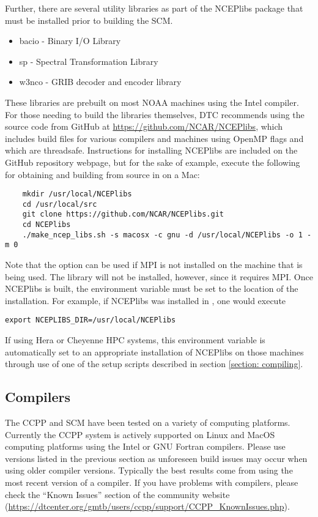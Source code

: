 Further, there are several utility libraries as part of the NCEPlibs package that must be installed prior to building the SCM. 
\begin{itemize}
    \item bacio - Binary I/O Library
    \item sp - Spectral Transformation Library
    \item w3nco - GRIB decoder and encoder library
\end{itemize}
These libraries are prebuilt on most NOAA machines using the Intel compiler. For those needing to build the libraries themselves, DTC recommends using the source code from GitHub at \url{https://github.com/NCAR/NCEPlibs}, which includes build files for various compilers and machines using OpenMP flags and which are threadsafe. Instructions for installing NCEPlibs are included on the GitHub repository webpage, but for the sake of example, execute the following for obtaining and building from source in  on a Mac:
\begin{lstlisting}
    mkdir /usr/local/NCEPlibs
    cd /usr/local/src
    git clone https://github.com/NCAR/NCEPlibs.git
    cd NCEPlibs
    ./make_ncep_libs.sh -s macosx -c gnu -d /usr/local/NCEPlibs -o 1 -m 0
\end{lstlisting}
Note that the option  can be used if MPI is not installed on the machine that is being used. The  library will not be installed, however, since it requires MPI. Once NCEPlibs is built, the  environment variable must be set to the location of the installation. For example, if NCEPlibs was installed in , one would execute
\begin{lstlisting}
export NCEPLIBS_DIR=/usr/local/NCEPlibs
\end{lstlisting}
If using Hera or Cheyenne HPC systems, this environment variable is automatically set to an appropriate installation of NCEPlibs on those machines through use of one of the setup scripts described in section \ref{section: compiling}.


\subsection{Compilers}
The CCPP and SCM have been tested on a variety of
computing platforms. Currently the CCPP system is actively supported
on Linux and MacOS computing platforms using the Intel or GNU Fortran
compilers. Please use versions listed in the previous section as unforeseen
build issues may occur when using older compiler versions. Typically the best results come from using the
most recent version of a compiler. If you have problems with compilers, please check the ``Known Issues'' section of the
community website (\url{https://dtcenter.org/gmtb/users/ccpp/support/CCPP_KnownIssues.php}).

